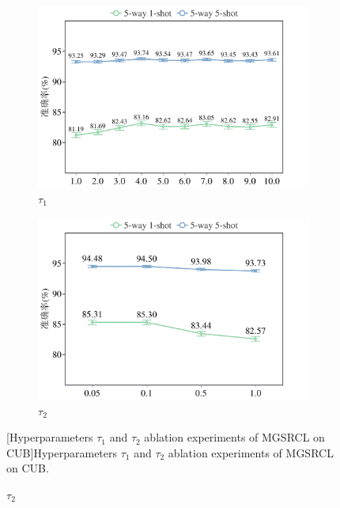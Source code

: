 \begin{figure}[h!]
\centering
{}
\begin{subfigure}{0.495\columnwidth}
\includegraphics[width=\columnwidth]{figures/MGSRCL/CUB/t1.pdf}
\caption{$\tau_1$}
\label{figure3: t1(CUB)}
\end{subfigure}
\begin{subfigure}{0.495\columnwidth}
\includegraphics[width=\columnwidth]{figures/MGSRCL/CUB/t2.pdf}
\caption{$\tau_2$}
\label{figure3: t2(CUB)}
\end{subfigure}
[Hyperparameters $\tau_1$ and $\tau_2$ ablation experiments of MGSRCL on CUB]{Hyperparameters $\tau_1$ and $\tau_2$ ablation experiments of MGSRCL on CUB.}
\label{figure3: t1 and t2 (CUB)}
\end{figure}

